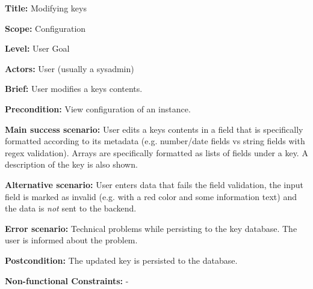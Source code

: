 
\begin{DoxyItemize}
\item {\bfseries Title\+:} Modifying keys
\item {\bfseries Scope\+:} Configuration
\item {\bfseries Level\+:} User Goal
\item {\bfseries Actors\+:} User (usually a sysadmin)
\item {\bfseries Brief\+:} User modifies a key\textquotesingle{}s contents.
\end{DoxyItemize}


\begin{DoxyItemize}
\item {\bfseries Precondition\+:} View configuration of an instance.
\item {\bfseries Main success scenario\+:} User edits a key\textquotesingle{}s contents in a field that is specifically formatted according to its metadata (e.\+g. number/date fields vs string fields with regex validation). Arrays are specifically formatted as lists of fields under a key. A description of the key is also shown.
\item {\bfseries Alternative scenario\+:} User enters data that fails the field validation, the input field is marked as invalid (e.\+g. with a red color and some information text) and the data is {\itshape not} sent to the backend.
\item {\bfseries Error scenario\+:} Technical problems while persisting to the key database. The user is informed about the problem.
\item {\bfseries Postcondition\+:} The updated key is persisted to the database.
\item {\bfseries Non-\/functional Constraints\+:} -\/ 
\end{DoxyItemize}